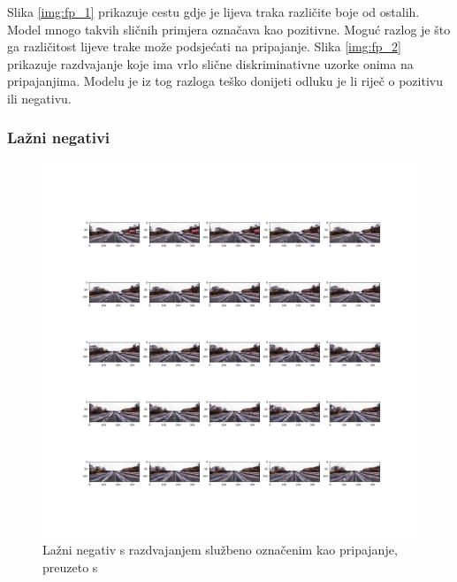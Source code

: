 \documentclass[times, utf8, diplomski, numeric]{fer}
\begin{document}
Slika \ref{img:fp_1} prikazuje cestu gdje je lijeva traka različite boje od ostalih. 
Model mnogo takvih sličnih primjera označava kao pozitivne. Moguć razlog je što ga različitost lijeve trake može podsjećati na pripajanje.
Slika \ref{img:fp_2} prikazuje razdvajanje koje ima vrlo slične diskriminativne uzorke onima na pripajanjima. 
Modelu je iz tog razloga teško donijeti odluku je li riječ o pozitivu ili negativu.

\subsubsection{Lažni negativi }
\begin{figure}[H]
\centering
\includegraphics[scale=0.3]{images/fn_1.png}
\caption{Lažni negativ s razdvajanjem službeno označenim kao pripajanje, preuzeto s \citep{url:ftts_irap}}
\label{img:fn_1}
\end{figure}
\end{document}
